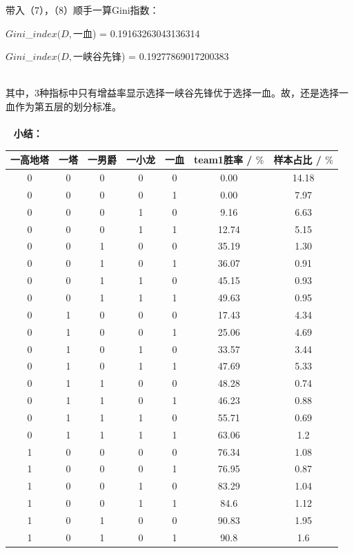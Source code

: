 \documentclass[lang=cn,11pt]{elegantpaper}
\begin{document}
带入（7），（8）顺手一算Gini指数：

$Gini$\_$index(D,$一血) = 0.19163263043136314

$Gini$\_$index(D,$一峡谷先锋) = 0.19277869017200383
\\~

其中，3种指标中只有增益率显示选择一峡谷先锋优于选择一血。故，还是选择一血作为第五层的划分标准。
\\~
\\~
\textbf{小结：}
\begin{table}[htbp]
\begin{center}
\begin{tabular}{ccccccc}
\toprule
一高地塔& 一塔& 一男爵& 一小龙& 一血& team1胜率 / $ \% $ & 样本占比 / $ \% $\\
\midrule
 0 & 0 & 0 & 0 & 0 & 0.00 & 14.18 \\
\hline
 0 & 0 & 0 & 0 & 1 & 0.00 & 7.97 \\
\hline
 0 & 0 & 0 & 1 & 0 & 9.16 & 6.63 \\
\hline
 0 & 0 & 0 & 1 & 1 & 12.74 & 5.15 \\
\hline
 0 & 0 & 1 & 0 & 0 & 35.19	& 1.30 \\
\hline
 0 & 0 & 1 & 0 & 1 & 36.07	& 0.91 \\
\hline
 0 & 0 & 1 & 1 & 0 & 45.15	& 0.93 \\
\hline
 0 & 0 & 1 & 1 & 1 & 49.63	& 0.95 \\
\hline
 0 & 1 & 0 & 0 & 0 & 17.43	& 4.34 \\
\hline
 0 & 1 & 0 & 0 & 1 & 25.06	& 4.69 \\
\hline
 0 & 1 & 0 & 1 & 0 & 33.57	& 3.44 \\
\hline
 0 & 1 & 0 & 1 & 1 & 47.69	& 5.33 \\
\hline
 0 & 1 & 1 & 0 & 0 & 48.28	& 0.74 \\
\hline
 0 & 1 & 1 & 0 & 1 & 46.23	& 0.88 \\
\hline
 0 & 1 & 1 & 1 & 0 & 55.71	& 0.69 \\
\hline
 0 & 1 & 1 & 1 & 1 & 63.06	& 1.2 \\
\hline
 1 & 0 & 0 & 0 & 0 & 76.34	& 1.08 \\
\hline
 1 & 0 & 0 & 0 & 1 & 76.95	& 0.87 \\
\hline
 1 & 0 & 0 & 1 & 0 & 83.29	& 1.04 \\
\hline
 1 & 0 & 0 & 1 & 1 & 84.6	& 1.12 \\
\hline
 1 & 0 & 1 & 0 & 0 & 90.83	& 1.95 \\
\hline
 1 & 0 & 1 & 0 & 1 & 90.8	& 1.6 \\

\end{tabular}
\end{center}
\end{table}
\end{document}
